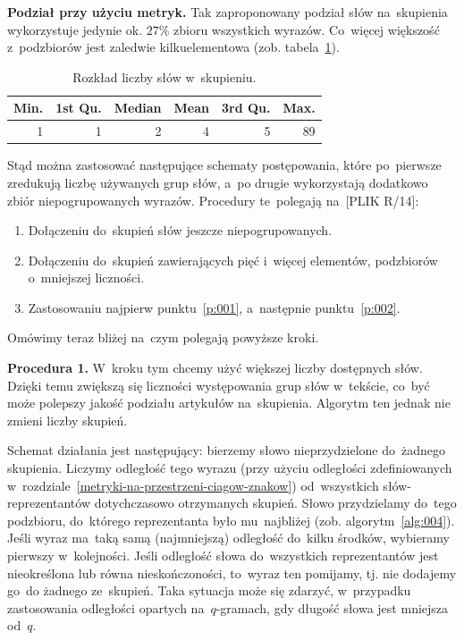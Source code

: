 \documentclass{praca1}
\begin{document}
\textbf{Podział przy użyciu metryk.}
Tak zaproponowany podział słów na~skupienia wykorzystuje jedynie ok. $27\%$ zbioru wszystkich wyrazów. Co~więcej większość z~podzbiorów jest zaledwie kilkuelementowa (zob. tabela~\ref{tab:004}). 

\begin{table}[!h]
\centering
\begin{tabular}{|r|r|r|r|r|r|}
  \hline
Min. & 1st Qu. & Median & Mean & 3rd Qu. & Max. \\ 
  \hline
1 & 1 & 2 & 4 & 5 & 89 \\ 
   \hline
\end{tabular}
\caption{Rozkład liczby słów w~skupieniu.}
\label{tab:004}
\end{table}


Stąd można zastosować następujące schematy postępowania, które po~pierwsze zredukują liczbę używanych grup słów, a~po drugie wykorzystają dodatkowo zbiór niepogrupowanych wyrazów. Procedury te~polegają na~[PLIK R/14]:
\begin{enumerate}
\item\label{p:001} Dołączeniu do~skupień słów jeszcze niepogrupowanych.
\item\label{p:002} Dołączeniu do~skupień zawierających pięć i~więcej elementów, podzbiorów o~mniejszej liczności.
\item Zastosowaniu najpierw punktu~\ref{p:001}, a~następnie punktu~\ref{p:002}.
\end{enumerate}

Omówimy teraz bliżej na~czym polegają powyższe kroki.

\textbf{Procedura 1.} W~kroku tym chcemy użyć większej liczby dostępnych słów. Dzięki temu zwiększą się liczności występowania grup słów w~tekście, co~być może polepszy jakość podziału artykułów na~skupienia. Algorytm ten jednak nie zmieni liczby skupień. 

Schemat działania jest następujący: bierzemy słowo nieprzydzielone do~żadnego skupienia. Liczymy odległość tego wyrazu (przy użyciu odległości zdefiniowanych w~rozdziale~\ref{metryki-na-przestrzeni-ciagow-znakow}) od~wszystkich słów-reprezentantów dotychczasowo otrzymanych skupień. Słowo przydzielamy do~tego podzbioru, do~którego reprezentanta było mu~najbliżej (zob. algorytm~\ref{alg:004}). Jeśli wyraz ma~taką samą (najmniejszą) odległość do~kilku środków, wybieramy pierwszy w~kolejności. Jeśli odległość słowa do~wszystkich reprezentantów jest nieokreślona lub równa nieskończoności, to~wyraz ten pomijamy, tj. nie dodajemy go~do żadnego ze~skupień. Taka sytuacja może się zdarzyć, w~przypadku zastosowania odległości opartych na~$q$-gramach, gdy długość słowa jest mniejsza od~$q$.
\end{document}
